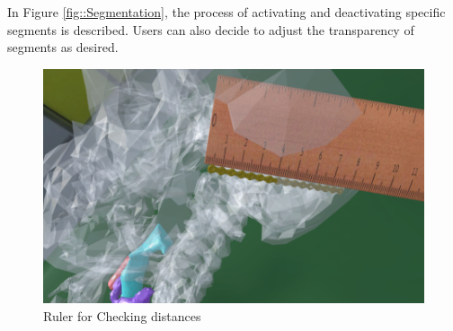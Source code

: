 In Figure \ref{fig::Segmentation}, the process of activating and deactivating specific segments is described.
Users can also decide to adjust the transparency of segments as desired.

\begin{figure}[ht!]
    \centering
    \includegraphics[width=\linewidth]{images/implementation/features/visualization/ruler.png}
    \caption{\label{fig::FeatureRuler} Ruler for Checking distances}
\end{figure}

